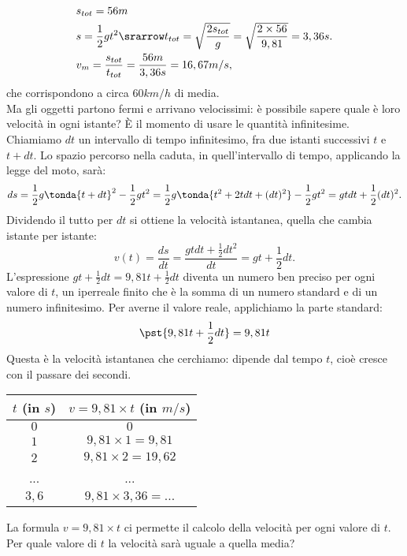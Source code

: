 \begin{align*}
 & s_{tot} = 56m\\
 & s =\frac{1}{2}gt^2 \srarrow t_{tot}= \sqrt{\frac{2s_{tot}}{g}}=
 \sqrt{\frac{2\times 56}{9,81}}=3,36 s.\\
 & v_m= \frac{s_{tot}}{t_{tot}}=\frac{56 m}{3,36 s}=16,67 m/s,
\end{align*}
che corrispondono a circa $60 km/h$ di media.\\
Ma gli oggetti partono fermi e arrivano velocissimi: 
è possibile sapere quale è loro velocità in ogni istante? È il momento
di usare le quantità infinitesime.\\
Chiamiamo $dt$ un intervallo di tempo infinitesimo, fra due istanti 
successivi
$t$ e $t+dt$.
Lo spazio percorso nella caduta, in quell'intervallo di tempo, applicando 
la legge del moto, sarà:
\[
 ds=\frac{1}{2}g\tonda{t+dt}^2-\frac{1}{2}gt^2=
 \frac{1}{2}g\tonda{t^2+2tdt+(dt)^2}-\frac{1}{2}gt^2=
 gtdt+\frac{1}{2}(dt)^2. 
\]
Dividendo il tutto per $dt$ si ottiene la velocità istantanea, quella che 
cambia istante per istante:
\[
 v(t)=\frac{ds}{dt}=\frac{gtdt+\frac{1}{2}dt^2}{dt}=gt+\frac{1}{2}dt.
\]
L'espressione $gt+\frac{1}{2}dt=9,81t+\frac{1}{2}dt$ diventa un numero ben
preciso per ogni valore di $t$, un iperreale finito che è la
somma di un numero standard e di un numero infinitesimo. 
Per averne il valore reale, applichiamo la parte standard:
\[
 \pst{9,81t+\frac{1}{2}dt}=9,81t
\]
Questa è la velocità istantanea che cerchiamo: dipende dal tempo $t$,
cioè cresce con il passare dei secondi. 

\begin{center}
\begin{tabular}{cc}\toprule
$t$ (in $s$) & $v=9,81\times t$ (in $m/s$) \\\midrule
$0$ & $0$  \\
$1$ & $9,81\times 1 =9,81$ \\
$2$ & $9,81\times 2 =19,62$ \\
... & ... \\
$3,6$ & $9,81\times 3,36= ...$\\\bottomrule
\end{tabular}
\label{tab:diff_velocita}
\end{center}

La formula $v=9,81\times t$ ci permette il calcolo della velocità per ogni 
valore di $t$.
Per quale valore di \(t\) la velocità sarà uguale a quella media? 


